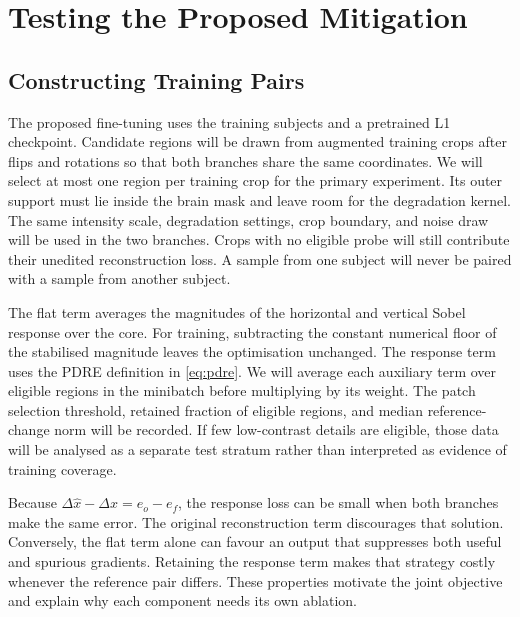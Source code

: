 \documentclass[journal]{IEEEtran}
\begin{document}
\section{Testing the Proposed Mitigation}
\label{sec:mitigation}
\subsection{Constructing Training Pairs}
The proposed fine-tuning uses the training subjects and a pretrained L1 checkpoint. Candidate regions will be drawn from augmented training crops after flips and rotations so that both branches share the same coordinates. We will select at most one region per training crop for the primary experiment. Its outer support must lie inside the brain mask and leave room for the degradation kernel. The same intensity scale, degradation settings, crop boundary, and noise draw will be used in the two branches. Crops with no eligible probe will still contribute their unedited reconstruction loss. A sample from one subject will never be paired with a sample from another subject.

The flat term averages the magnitudes of the horizontal and vertical Sobel response over the core. For training, subtracting the constant numerical floor of the stabilised magnitude leaves the optimisation unchanged. The response term uses the PDRE definition in \eqref{eq:pdre}. We will average each auxiliary term over eligible regions in the minibatch before multiplying by its weight. The patch selection threshold, retained fraction of eligible regions, and median reference-change norm will be recorded. If few low-contrast details are eligible, those data will be analysed as a separate test stratum rather than interpreted as evidence of training coverage.

Because $\Delta\hat{x}-\Delta x=e_o-e_f$, the response loss can be small when both branches make the same error. The original reconstruction term discourages that solution. Conversely, the flat term alone can favour an output that suppresses both useful and spurious gradients. Retaining the response term makes that strategy costly whenever the reference pair differs. These properties motivate the joint objective and explain why each component needs its own ablation.
\end{document}
